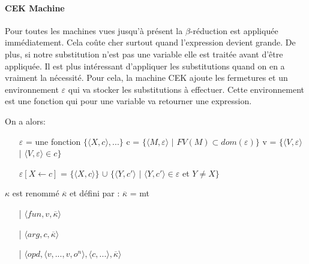 \documentclass[10pt,a4paper]{article}
\begin{document}
			\paragraph{CEK Machine}
		
				Pour toutes les machines vues jusqu'à présent la $\beta$-réduction est appliquée immédiatement. Cela coûte cher surtout quand l'expression devient grande. De plus, si notre substitution n'est pas une variable elle est traitée avant d'être appliquée.
				\smallbreak
				Il est plus intéressant d'appliquer les substitutions quand on en a vraiment la nécessité. Pour cela, la machine CEK ajoute les fermetures et un environnement $\varepsilon$ qui va stocker les substitutions à effectuer. Cette environnement est une fonction qui pour une variable va retourner une expression.
				\medbreak
				
				On a alors:
				\begin{itemize}
					\item[] $\varepsilon$ = une fonction $\{\langle X,c\rangle,...\}$    c = $\{\langle M,\varepsilon\rangle$ $|$ $FV(M)\subset dom(\varepsilon)\}$    v = $\{\langle V,\varepsilon\rangle$ $|$ $\langle V,\varepsilon\rangle \in c\}$
					\item[] $\varepsilon[X \leftarrow c]$ = $\{\langle X,c\rangle\}$ $\cup$ $\{\langle Y,c'\rangle$ $|$ $\langle Y,c'\rangle \in \varepsilon$ et $ Y \neq X\}$
				\end{itemize}
				\medbreak
				
				$\kappa$ est renommé $\overline{\kappa}$ et défini par :
				\smallbreak
				$\overline{\kappa}$ = mt
				\begin{itemize}
					\item[|] $\langle fun,v,\overline{\kappa} \rangle$
					\item[|] $\langle arg,c,\overline{\kappa} \rangle$
					\item[|] $\langle opd,\langle v,...,v,o^{n}\rangle,\langle c,... \rangle,\overline{\kappa} \rangle$
				\end{itemize}
				\bigbreak
				
\end{document}
